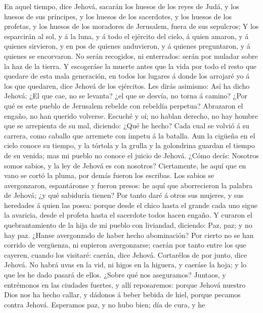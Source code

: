  En aquel tiempo, dice Jehová, sacarán los huesos de los
reyes de Judá, y los huesos de sus príncipes, y los huesos de los
sacerdotes, y los huesos de los profetas, y los huesos de los moradores
de Jerusalem, fuera de sus sepulcros;  Y los esparcirán al
sol, y á la luna, y á todo el ejército del cielo, á quien amaron, y á
quienes sirvieron, y en pos de quienes anduvieron, y á quienes
preguntaron, y á quienes se encorvaron. No serán recogidos, ni
enterrados: serán por muladar sobre la haz de la tierra.  Y
escogeráse la muerte antes que la vida por todo el resto que quedare de
esta mala generación, en todos los lugares á donde los arrojaré yo á los
que quedaren, dice Jehová de los ejércitos.  Les dirás
asimismo: Así ha dicho Jehová: ¿El que cae, no se levanta? ¿el que se
desvía, no torna á camino?  ¿Por qué es este pueblo de
Jerusalem rebelde con rebeldía perpetua? Abrazaron el engaño, no han
querido volverse.  Escuché y oí; no hablan derecho, no hay
hombre que se arrepienta de su mal, diciendo: ¿Qué he hecho? Cada cual
se volvió á su carrera, como caballo que arremete con ímpetu á la
batalla.  Aun la cigüeña en el cielo conoce su tiempo, y la
tórtola y la grulla y la golondrina guardan el tiempo de su venida; mas
mi pueblo no conoce el juicio de Jehová.  ¿Cómo decís:
Nosotros somos sabios, y la ley de Jehová es con nosotros? Ciertamente,
he aquí que en vano se cortó la pluma, por demás fueron los escribas.
 Los sabios se avergonzaron, espantáronse y fueron presos:
he aquí que aborrecieron la palabra de Jehová; ¿y qué sabiduría tienen?
 Por tanto daré á otros sus mujeres, y sus heredades á
quien las posea: porque desde el chico hasta el grande cada uno sigue la
avaricia, desde el profeta hasta el sacerdote todos hacen engaño.
 Y curaron el quebrantamiento de la hija de mi pueblo con
liviandad, diciendo: Paz, paz; y no hay paz.  ¿Hanse
avergonzado de haber hecho abominación? Por cierto no se han corrido de
vergüenza, ni supieron avergonzarse; caerán por tanto entre los que
cayeren, cuando los visitaré: caerán, dice Jehová. 
Cortarélos de por junto, dice Jehová. No habrá uvas en la vid, ni higos
en la higuera, y caeráse la hoja; y lo que les he dado pasará de ellos.
 ¿Sobre qué nos aseguramos? Juntaos, y entrémonos en las
ciudades fuertes, y allí reposaremos: porque Jehová nuestro Dios nos ha
hecho callar, y dádonos á beber bebida de hiel, porque pecamos contra
Jehová.  Esperamos paz, y no hubo bien; día de cura, y he
